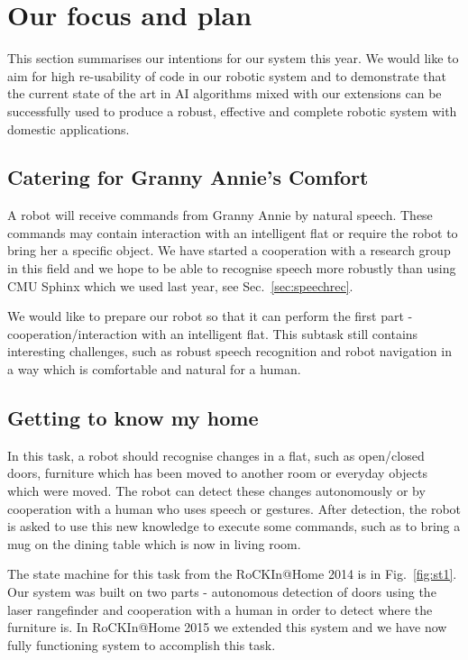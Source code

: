 
\section{Our focus and plan}

This section summarises our intentions for our system this year. We would like to aim for high re-usability of code in our robotic system and to demonstrate that the current state of the art in AI algorithms mixed with our extensions can be successfully used to produce a robust, effective and complete robotic system with domestic applications.  

\subsection{Catering for Granny Annie’s Comfort}

A robot will receive commands from Granny Annie by natural speech. These commands may contain interaction with an intelligent flat or require the robot to bring her a specific object. 
We have started a cooperation with a research group in this field and we hope to be able to recognise speech more robustly than using CMU Sphinx which we used last year, see Sec.~\ref{sec:speechrec}.

We would like to prepare our robot so that it can perform the first part - cooperation/interaction with an intelligent flat. This subtask still contains interesting challenges, such as robust speech recognition and robot navigation in a way which is comfortable and natural for a human.  


\subsection{Getting to know my home}

In this task, a robot should recognise changes in a flat, such as open/closed doors, furniture which has been moved to another room or everyday objects which were moved. 
The robot can detect these changes autonomously or by cooperation with a human who uses speech or gestures.
After detection, the robot is asked to use this new knowledge to execute some commands, such as to bring a mug on the dining table which is now in living room.

The state machine for this task from the RoCKIn@Home 2014 is in Fig.~\ref{fig:st1}.
Our system was built on two parts - autonomous detection of doors using the laser rangefinder and cooperation with a human in order to detect where the furniture is. 
In RoCKIn@Home 2015 we extended this system and we have now fully functioning system to accomplish this task.


